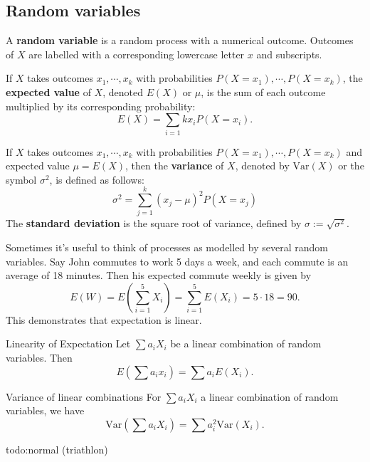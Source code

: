 \subsection{Random variables}
\begin{definition}[]
    A \textbf{random variable} is a random process with a numerical outcome. Outcomes of $X$ are labelled with a corresponding lowercase letter $x$ and subscripts.
\end{definition}
\begin{definition}[]
    If $X$ takes outcomes $x_1,\cdots ,x_k$ with probabilities $P(X=x_1), \cdots ,P(X=x_k)$, the \textbf{expected value}  of $X$, denoted $E(X)  $ or $\mu$, is the sum of each outcome multiplied by its corresponding probability: \[
        E(X) = \sum _{i=1}k x_i P(X=x_i ).
    \] 
\end{definition}
\begin{definition}
    If $X$ takes outcomes $x_1,\cdots ,x_k$ with probabilities $P(X=x_1), \cdots ,P(X=x_k)$ and expected value $\mu = E(X)$, then the \textbf{variance}  of $X$, denoted by $\mathrm{Var}(X)$ or the symbol $\sigma^2$, is defined as follows: \[
        \sigma^2 = \sum _{j=1}^k(x_j -\mu) ^2P(X=x_j )
    \] The \textbf{standard deviation} is the square root of variance, defined by $\sigma := \sqrt{\sigma^2} $.
\end{definition}
Sometimes it's useful to think of processes as modelled by several random variables. Say John commutes to work 5 days a week, and each commute is an average of 18 minutes. Then his expected commute weekly is given by \[
    E(W) = E\left(\sum _{i=1}^5 X_i \right)=\sum _{i=1}^5 E(X_i )=5\cdot 18=90.
\] This demonstrates that expectation is linear.
\begin{namedthing}{Linearity of Expectation} 
   Let $\sum a_i X_i $ be a linear combination of random variables. Then \[
       E\left(\sum a_i x_i \right)= \sum a_i E(X_i ).
   \] 
\end{namedthing}
\begin{namedthing}{Variance of linear combinations} 
For $\sum a_i X_i $ a linear combination of random variables, we have \[
    \mathrm{Var}\left( \sum a_i X_i  \right) = \sum a_i ^2 \mathrm{Var}(X_i ).
\] 
\end{namedthing}
{\color{red}todo:normal (triathlon)} 
